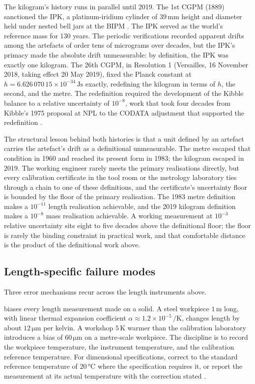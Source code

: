 The kilogram's history runs in parallel until 2019. The 1st CGPM
(1889) sanctioned the IPK, a platinum-iridium cylinder of $39 \,\si
{\milli\meter}$ height and diameter held under nested bell jars at
the BIPM
\cite{ch07t3-web:bipm-cgpm-1889-prototype,paper:girard-ipk-1994}.
The IPK served as the world's reference mass for 130 years. The
periodic verifications recorded apparent drifts among the artefacts
of order tens of micrograms over decades, but the IPK's primacy
made the absolute drift unmeasurable: by definition, the IPK was
exactly one kilogram. The 26th CGPM, in Resolution 1 (Versailles,
16 November 2018, taking effect 20 May 2019), fixed the Planck
constant at $h = 6.626\,070\,15 \times 10^{-34} \,\si{\joule\second}$
exactly, redefining the kilogram in terms of $h$, the second, and
the metre. The redefinition required the development of the Kibble
balance to a relative uncertainty of $10^{-8}$, work that took four
decades from Kibble's 1975 proposal at NPL to the CODATA
adjustment that supported the redefinition
\cite{paper:stock-kibble-2018,std:bipm-si2019,%
web:bipm-mise-en-pratique-kilogram-2019}.

The structural lesson behind both histories is that a unit defined
by an artefact carries the artefact's drift as a definitional
unmeasurable. The metre escaped that condition in 1960 and reached
its present form in 1983; the kilogram escaped in 2019. The working
engineer rarely meets the primary realisations directly, but every
calibration certificate in the tool room or the metrology
laboratory ties through a chain to one of these definitions, and
the certificate's uncertainty floor is bounded by the floor of the
primary realisation. The 1983 metre definition makes a $10^{-11}$
length realisation achievable, and the 2019 kilogram definition
makes a $10^{-8}$ mass realisation achievable. A working measurement
at $10^{-3}$ relative uncertainty sits eight to five decades above
the definitional floor; the floor is rarely the binding constraint
in practical work, and that comfortable distance is the product of
the definitional work above.

\subsection{Length-specific failure modes}

Three error mechanisms recur across the length instruments above.

 biases every length measurement made on a
solid. A steel workpiece $1 \,\si{\meter}$ long, with linear thermal
expansion coefficient $\alpha \approx 1.2 \times 10^{-5} \,\si{\per
\kelvin}$, changes length by about $12 \,\si{\micro\meter}$ per
kelvin. A workshop $5 \,\si{\kelvin}$ warmer than the calibration
laboratory introduces a bias of $60 \,\si{\micro\meter}$ on a
metre-scale workpiece. The discipline is to record the workpiece
temperature, the instrument temperature, and the calibration
reference temperature. For dimensional specifications, correct to
the standard reference temperature of $20 \,\si{\degreeCelsius}$
where the specification requires it, or report the measurement at
its actual temperature with the correction stated
\cite{std:iso-1-2022}.

